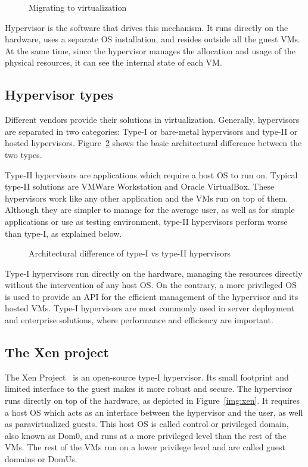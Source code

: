 \begin{figure}
	\centering
	
	\caption{Migrating to virtualization}
	\label{fig:tovirt}
\end{figure}

Hypervisor is the software that drives this mechanism. It runs directly on the hardware, uses a separate \ac{OS} installation, and resides outside all the guest \ac{VM}s. At the same time, since the hypervisor manages the allocation and usage of the physical resources, it can see the internal state of each \ac{VM}. 

\subsection{Hypervisor types}\label{sub:hyptypes}
Different vendors provide their solutions in virtualization. Generally, hypervisors are separated in two categories: Type-I or bare-metal hypervisors and type-II or hosted hypervisors. Figure~\ref{fig:hyptypes} shows the basic architectural difference between the two types.

\par Type-II hypervisors are applications which require a host \ac{OS} to run on. Typical type-II solutions are VMWare Workstation and Oracle VirtualBox. These hypervisors work like any other application and the \ac{VM}s run on top of them. Although they are simpler to manage for the average user, as well as for simple applications or use as testing environment, type-II hypervisors perform worse than type-I, as explained below. 

\begin{figure}
	\centering
	
	\caption{Architectural difference of type-I vs type-II hypervisors}
	\label{fig:hyptypes}
\end{figure}

\par Type-I hypervisors run directly on the hardware, managing the resources directly without the intervention of any host \ac{OS}. On the contrary, a more privileged \ac{OS} is used to provide an \ac{API} for the efficient management of the hypervisor and its hosted \ac{VM}s. Type-I hypervisors are most commonly used in server deployment and enterprise solutions, where performance and efficiency are important. 

\subsection{The Xen project}\label{sub:xen}
The Xen Project~\cite{xen} is an open-source type-I hypervisor. Its small footprint and limited interface to the guest makes it more robust and secure. The hypervisor runs directly on top of the hardware, as depicted in Figure~\ref{img:xen}. It requires a host \ac{OS} which acts as an interface between the hypervisor and the user, as well as paravirtualized guests. This host \ac{OS} is called control or privileged domain, also known as Dom0, and runs at a more privileged level than the rest of the \ac{VM}s. The rest of the \ac{VM}s run on a lower privilege level and are called guest domains or DomUs. 


